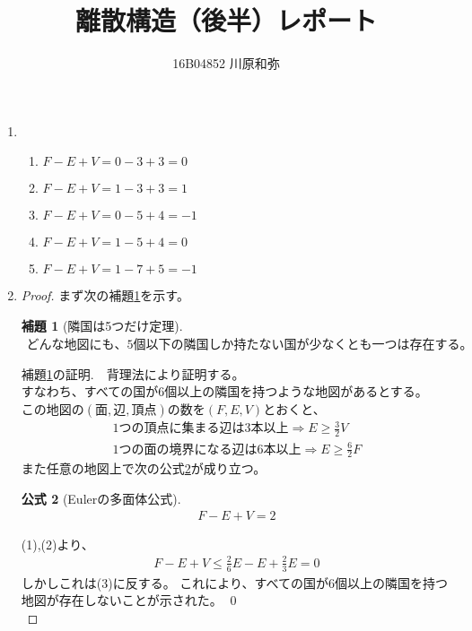 \documentclass{jsarticle}
\newtheorem{lem}{補題}
\newtheorem{fom}[lem]{公式}
\begin{document}
\title{離散構造（後半）レポート}
\author{16B04852 川原和弥}
\date{}
\maketitle


\begin{enumerate}


\item
\begin{enumerate}
\renewcommand{\labelenumii}{(\arabic{enumii})}
\item $ F - E + V = 0 - 3 + 3  = 0 $
\item $ F - E + V = 1 - 3 + 3  = 1 $
\item $ F - E + V = 0 - 5 + 4  = -1 $
\item $ F - E + V = 1 - 5 + 4  = 0 $
\item $ F - E + V = 1 - 7 + 5  = -1 $
\end{enumerate}


\item
\begin{proof}

まず次の補題\ref{ringoku}を示す。

\begin{lem}[隣国は5つだけ定理]
\label{ringoku}
\begin{eqnarray} どんな地図にも、5個以下の隣国しか持たない国が少なくとも一つは存在する。 \nonumber \end{eqnarray}
\end{lem}

補題\ref{ringoku}の証明.　背理法により証明する。\\
すなわち、すべての国が6個以上の隣国を持つような地図があるとする。\\
この地図の$(面,辺,頂点)$の数を$(F,E,V)$とおくと、
\begin{eqnarray}
1つの頂点に集まる辺は3本以上 \Rightarrow  E \geq \frac{3}{2} V \\
1つの面の境界になる辺は6本以上 \Rightarrow  E \geq \frac{6}{2} F
\end{eqnarray}
また任意の地図上で次の公式\ref{Euler}が成り立つ。
\begin{fom}[Eulerの多面体公式]
\label{Euler}
\begin{eqnarray} F - E + V = 2 \end{eqnarray}
\end{fom}
(1),(2)より、
\begin{eqnarray}
F - E + V \leq \frac{2}{6} E - E + \frac{2}{3} E = 0 \nonumber
\end{eqnarray}
しかしこれは(3)に反する。
これにより、すべての国が6個以上の隣国を持つ地図が存在しないことが示された。
\qed \\


\end{proof}
\end{enumerate}
\end{document}
